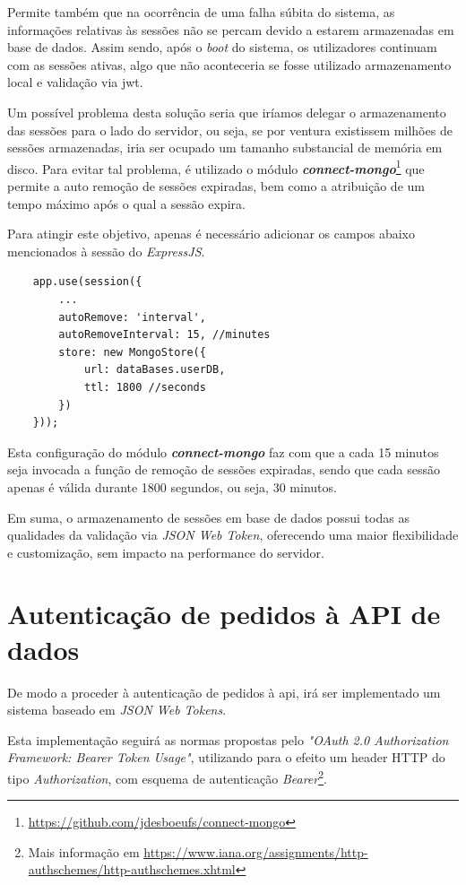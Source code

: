 Permite também que na ocorrência de uma falha súbita do sistema, as informações relativas às sessões não se percam devido a estarem armazenadas em base de dados. Assim sendo, após o \emph{boot} do sistema, os utilizadores continuam com as sessões ativas, algo que não aconteceria se fosse utilizado armazenamento local e validação via \gls{jwt}.

Um possível problema desta solução seria que iríamos delegar o armazenamento das sessões para o lado do servidor, ou seja, se por ventura existissem milhões de sessões armazenadas, iria ser ocupado um tamanho substancial de memória em disco. Para evitar tal problema, é utilizado o módulo \emph{\textbf{connect-mongo}}\footnote{\url{https://github.com/jdesboeufs/connect-mongo}} que permite a auto remoção de sessões expiradas, bem como a atribuição de um tempo máximo após o qual a sessão expira.

Para atingir este objetivo, apenas é necessário adicionar os campos abaixo mencionados à sessão do \emph{ExpressJS}.

\begin{verbatim}
    app.use(session({
        ...
        autoRemove: 'interval',
        autoRemoveInterval: 15, //minutes
        store: new MongoStore({
            url: dataBases.userDB,
            ttl: 1800 //seconds
        })
    }));
\end{verbatim}

Esta configuração do módulo \emph{\textbf{connect-mongo}} faz com que a cada 15 minutos seja invocada a função de remoção de sessões expiradas, sendo que cada sessão apenas é válida durante 1800 segundos, ou seja, 30 minutos.

Em suma, o armazenamento de sessões em base de dados possui todas as qualidades da validação via \emph{JSON Web Token}, oferecendo uma maior flexibilidade e customização, sem impacto na performance do servidor.

\cleardoublepage
\section{Autenticação de pedidos à API de dados}

De modo a proceder à autenticação de pedidos à \gls{api}, irá ser implementado um sistema baseado em \emph{JSON Web Tokens}.

Esta implementação seguirá as normas propostas pelo \emph{"OAuth 2.0 Authorization Framework: Bearer Token Usage"}\cite{rfc6750}, utilizando para o efeito um header HTTP do tipo \emph{Authorization}, com esquema de autenticação \emph{Bearer}\footnote{Mais informação em \url{https://www.iana.org/assignments/http-authschemes/http-authschemes.xhtml}}.

